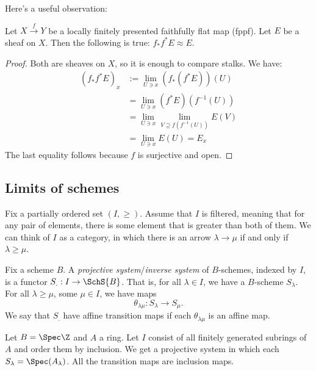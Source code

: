 \documentclass[11pt, english]{article}
\begin{document}
Here's a useful observation:
\begin{lemma}
\label{lemma:pullpush}
Let $X \xrightarrow{f} Y$ be a locally finitely presented faithfully flat map (fppf). Let $E$ be a sheaf on $X$. Then the following is true: $f_\ast f^\ast E \approx E$.
\end{lemma}
\begin{proof}
Both are sheaves on $X$, so it is enough to compare stalks. We have:
\begin{align*}
(f_\ast f^\ast E)_x &:= \lim_{U \ni x} (f_\ast(f^\ast E))(U) \\
&= \lim_{U \ni x} (f^\ast E)(f^{-1}(U))\\
&= \lim_{U \ni x} \lim_{V \supseteq f(f^{-1}(U))} E(V) \\
&= \lim_{U \ni x} E(U) = E_x
\end{align*}
The last equality follows because $f$ is surjective and open.
\end{proof}

\subsection{Limits of schemes}

Fix a partially ordered set $(I,\geq)$. Assume that $I$ is filtered, meaning that for any pair of elements, there is some element that is greater than both of them. We can think of $I$ as a category, in which there is an arrow $\lambda \to \mu$ if and only if $\lambda \geq \mu$. 

Fix a scheme $B$. A \emph{projective system}/\emph{inverse system} of $B$-schemes, indexed by $I$, is a functor $S_. : I \to \SchS{B}$. That is, for all $\lambda \in I$, we have a $B$-scheme $S_\lambda$. For all $\lambda \geq \mu$, some $\mu \in I$, we have maps 
\[
\theta_{\lambda \mu}:S_\lambda \to S_\mu.
\]
We say that $S_.$ have affine transition maps if each $\theta_{\lambda\mu}$ is an affine map.

\begin{example}
Let $B= \Spec \Z$ and $A$ a ring. Let $I$ consist of all finitely generated subrings of $A$ and order them by inclusion. We get a projective system in which each $S_\lambda = \Spec(A_\lambda)$. All the transition maps are inclusion maps. 
\end{example}
\end{document}
